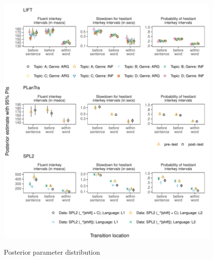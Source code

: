 \begin{appendix}
\begin{figure}[!htb]
\includegraphics{figures/psplots2.pdf}
\label{fig:fullps1}
\caption{Posterior parameter distribution}
\end{figure}
\end{appendix}
